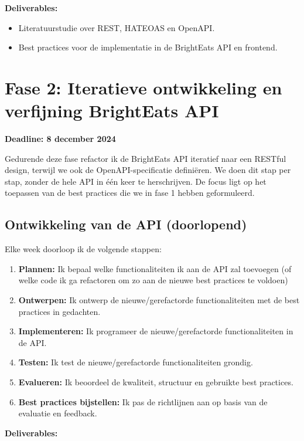 \textbf{Deliverables:}

\begin{itemize}
  \item Literatuurstudie over REST, HATEOAS en OpenAPI.
  \item Best practices voor de implementatie in de BrightEats API en frontend.
\end{itemize}

\section{Fase 2: Iteratieve ontwikkeling en verfijning BrightEats API}

\textbf{Deadline: 8 december 2024}

\bigskip
Gedurende deze fase refactor ik de BrightEats API iteratief naar een RESTful design, terwijl we ook de OpenAPI-specificatie definiëren. We doen dit stap per stap, zonder de hele API in één keer te herschrijven. De focus ligt op het toepassen van de best practices die we in fase 1 hebben geformuleerd.

\subsection{Ontwikkeling van de API (doorlopend)}

\bigskip
Elke week doorloop ik de volgende stappen:

\begin{enumerate}
  \item \textbf{Plannen:} Ik bepaal welke functionaliteiten ik aan de API zal toevoegen (of welke code ik ga refactoren om zo aan de nieuwe best practices te voldoen)
  \item \textbf{Ontwerpen:} Ik ontwerp de nieuwe/gerefactorde functionaliteiten met de best practices in gedachten.
  \item \textbf{Implementeren:} Ik programeer de nieuwe/gerefactorde functionaliteiten in de API.
  \item \textbf{Testen:} Ik test de nieuwe/gerefactorde functionaliteiten grondig.
  \item \textbf{Evalueren:} Ik beoordeel de kwaliteit, structuur en gebruikte best practices.
  \item \textbf{Best practices bijstellen:} Ik pas de richtlijnen aan op basis van de evaluatie en feedback.
\end{enumerate}

\textbf{Deliverables:}

